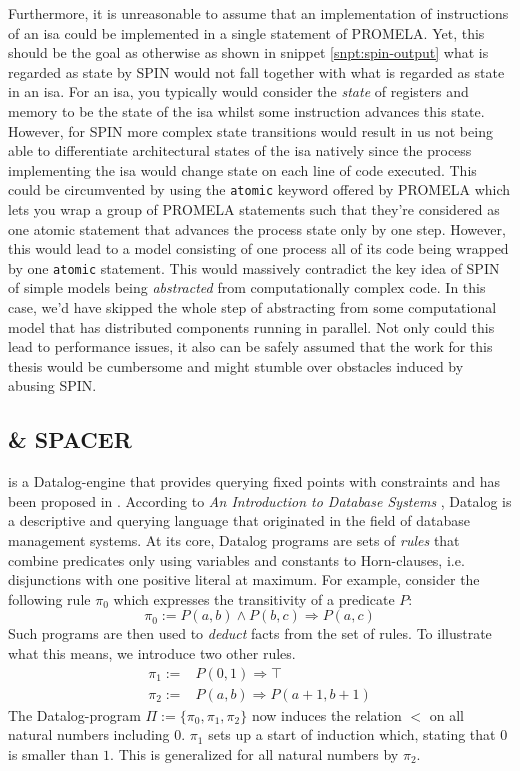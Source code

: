 Furthermore, it is unreasonable to assume that an implementation of instructions of an \gls{isa} could be implemented in a single statement of PROMELA.
Yet, this should be the goal as otherwise as shown in snippet \ref{snpt:spin-output} what is regarded as state by SPIN would not fall together with what is regarded as state in an \gls{isa}.
For an \gls{isa}, you typically would consider the \textit{state} of registers and memory to be the state of the \gls{isa} whilst some instruction advances this state.
However, for SPIN more complex state transitions would result in us not being able to differentiate architectural states of the \gls{isa} natively since the process implementing the \gls{isa} would change state on each line of code executed.
This could be circumvented by using the \lstinline{atomic} keyword offered by PROMELA which lets you wrap a group of PROMELA statements such that they're considered as one atomic statement that advances the process state only by one step.
However, this would lead to a model consisting of one process all of its code being wrapped by one \lstinline{atomic} statement.
This would massively contradict the key idea of SPIN of simple models being \textit{abstracted} from computationally complex code.
In this case, we'd have skipped the whole step of abstracting from some computational model that has distributed components running in parallel.
Not only could this lead to performance issues, it also can be safely assumed that the work for this thesis would be cumbersome and might stumble over obstacles induced by abusing SPIN.

\subsection{\muZ{} \& SPACER}
\label{sec:spacer}

\muZ{} is a Datalog-engine that provides querying fixed points with constraints and has been proposed in \cite{Hoder11}.
According to \textit{An Introduction to Database Systems} \cite[p.790ff]{Date00}, Datalog is a descriptive and querying language that originated in the field of database management systems.
At its core, Datalog programs are sets of \textit{rules} that combine predicates only using variables and constants to Horn-clauses, i.e. disjunctions with one positive literal at maximum.
For example, consider the following rule $ \pi_0 $ which expresses the transitivity of a predicate $ P $:
\begin{equation*}
    \pi_0 := P(a, b) \land P(b, c) \Rightarrow P(a, c)
\end{equation*}
Such programs are then used to \textit{deduct} facts from the set of rules.
To illustrate what this means, we introduce two other rules.
\begin{align*}
    \pi_1 := & P(0, 1) \Rightarrow \top \\
    \pi_2 := & P(a, b) \Rightarrow P(a + 1, b + 1)
\end{align*}
The Datalog-program $ \Pi := \{ \pi_0, \pi_1, \pi_2 \} $ now induces the relation $ < $ on all natural numbers including $ 0 $.
$ \pi_1 $ sets up a start of induction which, stating that $ 0 $ is smaller than $ 1 $.
This is generalized for all natural numbers by $ \pi_2 $.

